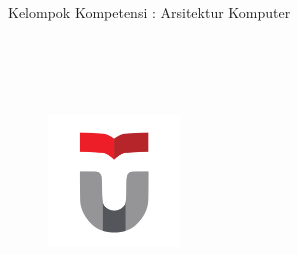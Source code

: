 \begin{titlepage}
    \begin{center}
        \vspace*{1.0cm}
        \bo{\Judul} \\[1.0cm]
        \bo{\Type} \\
        Kelompok Kompetensi : Arsitektur Komputer \\[1.0cm]
        \\[1.0cm]
		\\[1.0cm]
        \bo{\Penulis} \\
        \bo{\npm} \\

		\begin{figure}
			\begin{center}
				\includegraphics[width=3.5cm]{pics/telu.png}
			\end{center}
		\end{figure}    

    \end{center}
\end{titlepage}